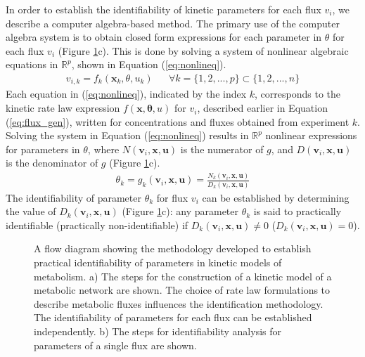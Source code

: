 \documentclass[10pt]{article}
\begin{document}
In order to establish the identifiability of kinetic parameters for each flux $v_i$, we describe a computer algebra-based method. The primary use of the computer algebra system is to obtain closed form expressions for each parameter in $\theta$ for each flux $v_i$ (Figure \ref{fig:ident-flowchart}c). This is done by solving a system of nonlinear algebraic equations in $\mathbb{R}^p$, shown in Equation (\ref{eq:nonlineq}).
\begin{align}\label{eq:nonlineq}
v_{i, k} = f_k(\mathbf{x}_k,\theta, u_k) && \forall k=\{1, 2, ..., p\}\subset\{1, 2, ..., n\}
\end{align}
Each equation in (\ref{eq:nonlineq}), indicated by the index $k$, corresponds to the kinetic rate law expression $f(\mathbf{x},\mathbf{\theta}, u)$ for $v_i$, described earlier in Equation (\ref{eq:flux_gen}), written for concentrations and fluxes obtained from experiment $k$. Solving the system in Equation (\ref{eq:nonlineq}) results in $\mathbb{R}^p$ nonlinear expressions for parameters in $\theta$, where $N(\mathbf{v}_i, \mathbf{x}, \mathbf{u})$ is the numerator of $g$, and $D(\mathbf{v}_i, \mathbf{x}, \mathbf{u})$ is the denominator of $g$ (Figure \ref{fig:ident-flowchart}c).
\begin{align}\label{eq:theta-eq}
\theta_k = g_k(\mathbf{v}_i, \mathbf{x}, \mathbf{u}) = \frac{N_k(\mathbf{v}_i, \mathbf{x}, \mathbf{u})}{D_k(\mathbf{v}_i, \mathbf{x}, \mathbf{u})}
\end{align}
The identifiability of parameter $\theta_k$ for flux $v_i$ can be established by determining the value of $D_k(\mathbf{v}_i, \mathbf{x}, \mathbf{u})$ (Figure \ref{fig:ident-flowchart}c): any parameter $\theta_k$ is said to practically identifiable (practically non-identifiable) if $D_k(\mathbf{v}_i, \mathbf{x}, \mathbf{u})\neq0$ ($D_k(\mathbf{v}_i, \mathbf{x}, \mathbf{u}) = 0$). 

\begin{figure}[!tbhp]
	\caption{A flow diagram showing the methodology developed to establish practical identifiability of parameters in kinetic models of metabolism. a) The steps for the construction of a kinetic model of a metabolic network are shown. The choice of rate law formulations to describe metabolic fluxes influences the identification methodology. The identifiability of parameters for each flux can be established independently. b) The steps for identifiability analysis for parameters of a single flux are shown.}\label{fig:ident-flowchart}
\end{figure}	
\end{document}
